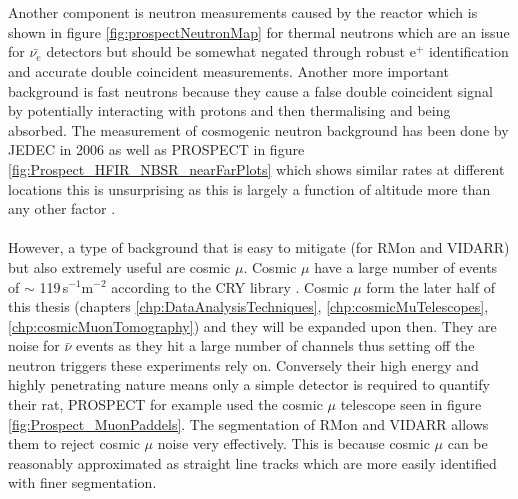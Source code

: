 \\\\Another component is neutron measurements caused by the reactor which is shown in figure \ref{fig:prospectNeutronMap} for thermal neutrons which are an issue for $\bar{\nu_e}$ detectors but should be somewhat negated through robust e$^+$ identification and accurate double coincident measurements. Another more important background is fast neutrons because they cause a false double coincident signal by potentially interacting with protons and then thermalising and being absorbed. The measurement of cosmogenic neutron background has been done by JEDEC in 2006 \cite{JEDEC_2006} as well as PROSPECT in figure \ref{fig:Prospect_HFIR_NBSR_nearFarPlots} which shows similar rates at different locations this is unsurprising as this is largely a function of altitude more than any other factor \cite{Ashenfelter_2016}. \\\\However, a type of background that is easy to mitigate (for RMon and VIDARR) but also extremely useful are cosmic $\mu$. Cosmic $\mu$ have a large number of events of $\sim$ 119\,s$^{-1}$m$^{-2}$ according to the CRY library \cite{ieee_cry_2007}. Cosmic $\mu$ form the later half of this thesis (chapters \ref{chp:DataAnalysisTechniques}, \ref{chp:cosmicMuTelescopes}, \ref{chp:cosmicMuonTomography}) and they will be expanded upon then. They are noise for $\bar{\nu}$ events as they hit a large number of channels thus setting off the neutron triggers these experiments rely on. Conversely their high energy and highly penetrating nature means only a simple detector is required to quantify their rat, PROSPECT for example used the cosmic $\mu$ telescope seen in figure \ref{fig:Prospect_MuonPaddels}. The segmentation of RMon and VIDARR allows them to reject cosmic $\mu$ noise very effectively. This is because cosmic $\mu$ can be reasonably approximated as straight line tracks which are more easily identified with finer segmentation. %


